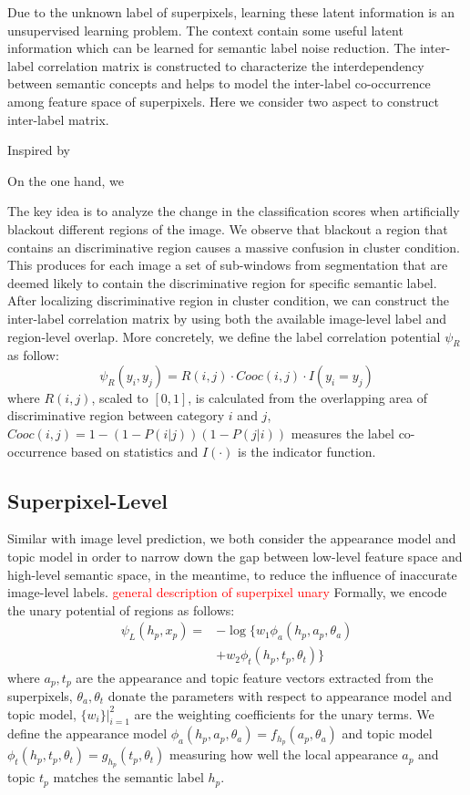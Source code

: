 Due to the unknown label of superpixels, learning these latent information is an unsupervised learning problem. The context contain some useful latent information which can be learned for semantic label noise reduction. The inter-label correlation matrix is constructed to characterize the interdependency between semantic concepts and helps to model the inter-label co-occurrence among feature space of superpixels. Here we consider two aspect to construct inter-label matrix.

Inspired by \cite{russakovsky2014imagenet}

On the one hand, we

The key idea is to analyze the change in the classification scores when artificially blackout different regions of the image. We observe that blackout a region that contains an discriminative region causes a massive confusion in cluster condition. This produces for each image a set of sub-windows from segmentation that are deemed likely to contain the discriminative region for specific semantic label. After localizing discriminative region in cluster condition, we can construct the inter-label correlation matrix by using both the available image-level label and region-level overlap. More concretely, we define the label correlation potential $\psi_R$ as follow:
\begin{equation}
    \psi_{R}(y_i,y_j) = R(i,j) \cdot Cooc(i,j) \cdot I(y_i=y_j)
\end{equation}
where $R(i,j)$, scaled to $[0,1]$, is calculated from the overlapping area of discriminative region between category $i$ and $j$, $Cooc(i,j) = 1-(1-P(i|j))(1-P(j|i))$ measures the label co-occurrence based on statistics and $I(\cdot)$ is the indicator function.

\subsection{Superpixel-Level}
Similar with image level prediction, we both consider the appearance model and topic model in order to narrow down the gap between low-level feature space and high-level semantic space, in the meantime, to reduce the influence of inaccurate image-level labels. {\textcolor{red}{general description of superpixel unary}}
Formally, we encode the unary potential of regions as follows:
\begin{equation}
    \begin{aligned}
        \psi_{L}(h_p,x_p) = &- \log \big\{ w_1\phi_a(h_p,a_p,\theta_a) \\
        &+ w_2\phi_t(h_p,t_p,\theta_t) \big\}
    \end{aligned}
\end{equation}
where $a_p, t_p$ are the appearance and topic feature vectors extracted from the superpixels, $\theta_a, \theta_t$ donate the parameters with respect to appearance model and topic model, $\{w_i\}|_{i=1}^2$ are the weighting coefficients for the unary terms. We define the appearance model $\phi_a(h_p,a_p,\theta_a) = f_{h_p}(a_p,\theta_a)$ and topic model $\phi_t(h_p,t_p,\theta_t) = g_{h_p}(t_p,\theta_t)$ measuring how well the local appearance $a_p$ and topic $t_p$ matches the semantic label $h_p$.

